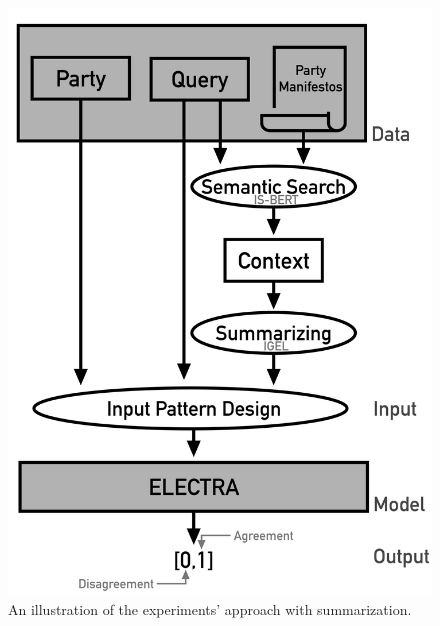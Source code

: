 \begin{figure}[h!]
\centering
\includegraphics[width = 0.6\linewidth]{figures/Experiments2.png}
\caption{An illustration of the experiments' approach with summarization.}
\label{fig:experiments2}
\end{figure}

